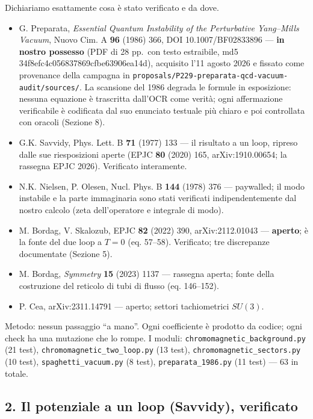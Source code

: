 \documentclass[
]{article}
\providecommand{\tightlist}{%
  \setlength{\itemsep}{0pt}\setlength{\parskip}{0pt}}
\begin{document}
Dichiariamo esattamente cosa è stato verificato e da dove.

\begin{itemize}
\tightlist
\item
  G. Preparata, \emph{Essential Quantum Instability of the Perturbative
  Yang--Mills Vacuum}, Nuovo Cim. A \textbf{96} (1986) 366, DOI
  10.1007/BF02833896 --- \textbf{in nostro possesso} (PDF di 28 pp.~con
  testo estraibile, md5 34f8efc4c056837869cfbe63906ea14d), acquisito
  l'11 agosto 2026 e fissato come provenance della campagna in
  \texttt{proposals/P229-preparata-qcd-vacuum-audit/sources/}. La
  scansione del 1986 degrada le formule in esposizione: nessuna
  equazione è trascritta dall'OCR come verità; ogni affermazione
  verificabile è codificata dal suo enunciato testuale più chiaro e poi
  controllata con oracoli (Sezione 8).
\item
  G.K. Savvidy, Phys. Lett. B \textbf{71} (1977) 133 --- il risultato a
  un loop, ripreso dalle sue riesposizioni aperte (EPJC \textbf{80}
  (2020) 165, arXiv:1910.00654; la rassegna EPJC 2026). Verificato
  interamente.
\item
  N.K. Nielsen, P. Olesen, Nucl. Phys. B \textbf{144} (1978) 376 ---
  paywalled; il modo instabile e la parte immaginaria sono stati
  verificati indipendentemente dal nostro calcolo (zeta dell'operatore e
  integrale di modo).
\item
  M. Bordag, V. Skalozub, EPJC \textbf{82} (2022) 390, arXiv:2112.01043
  --- \textbf{aperto}; è la fonte del due loop a \(T=0\) (eq. 57--58).
  Verificato; tre discrepanze documentate (Sezione 5).
\item
  M. Bordag, \emph{Symmetry} \textbf{15} (2023) 1137 --- rassegna
  aperta; fonte della costruzione del reticolo di tubi di flusso (eq.
  146--152).
\item
  P. Cea, arXiv:2311.14791 --- aperto; settori tachiometrici \(SU(3)\).
\end{itemize}

Metodo: nessun passaggio ``a mano''. Ogni coefficiente è prodotto da
codice; ogni check ha una mutazione che lo rompe. I moduli:
\texttt{chromomagnetic\_background.py} (21 test),
\texttt{chromomagnetic\_two\_loop.py} (13 test),
\texttt{chromomagnetic\_sectors.py} (10 test),
\texttt{spaghetti\_vacuum.py} (8 test), \texttt{preparata\_1986.py} (11
test) --- 63 in totale.

\hypertarget{il-potenziale-a-un-loop-savvidy-verificato}{%
\subsection{2. Il potenziale a un loop (Savvidy),
verificato}\label{il-potenziale-a-un-loop-savvidy-verificato}}
\end{document}
